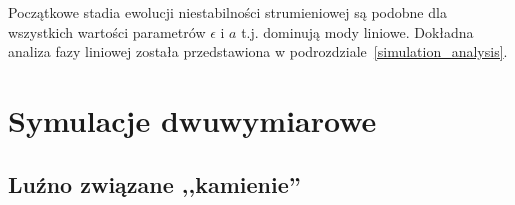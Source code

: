 Początkowe stadia ewolucji niestabilności strumieniowej są podobne dla
wszystkich wartości parametrów $\epsilon$ i $a$ t.j. dominują mody liniowe.
Dokładna analiza fazy liniowej została przedstawiona w
podrozdziale~\ref{simulation_analysis}.


\section{Symulacje dwuwymiarowe}

\subsection{Luźno związane ,,kamienie''}%

